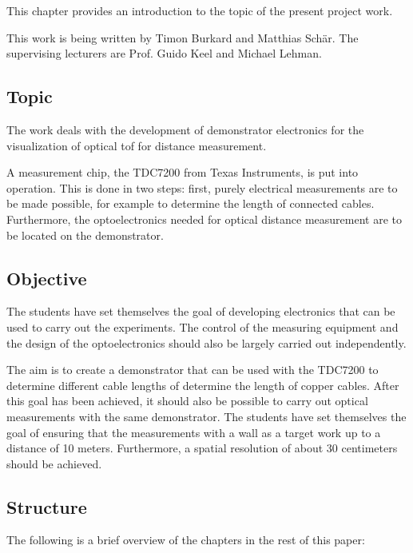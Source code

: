 This chapter provides an introduction to the topic of the present project work.

This work is being written by Timon Burkard and Matthias Schär. The supervising lecturers are Prof. Guido Keel and
Michael Lehman.

\subsection{Topic}

The work deals with the development of demonstrator electronics for the visualization of optical \acrfull{tof} for
distance measurement.

A measurement chip, the TDC7200 from Texas Instruments, is put into operation. This is done in two steps: first, purely
electrical measurements are to be made possible, for example to determine the length of connected cables. Furthermore,
the optoelectronics needed for optical distance measurement are to be located on the demonstrator.

\subsection{Objective}

The students have set themselves the goal of developing electronics that can be used to carry out the experiments. The
control of the measuring equipment and the design of the optoelectronics should also be largely carried out independently.

The aim is to create a demonstrator that can be used with the TDC7200 to determine different cable lengths of determine
the length of copper cables. After this goal has been achieved, it should also be possible to carry out optical
measurements with the same demonstrator. The students have set themselves the goal of ensuring that the measurements
with a wall as a target work up to a distance of 10 meters. Furthermore, a spatial resolution of about 30 centimeters
should be achieved.

\subsection{Structure}

The following is a brief overview of the chapters in the rest of this paper:

